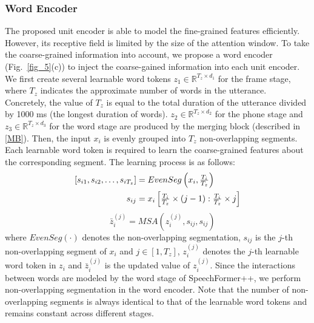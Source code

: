 \documentclass[lettersize,journal]{IEEEtran}
\begin{document}
\subsubsection{Word Encoder}
The proposed unit encoder is able to model the fine-grained features efficiently. However, its receptive field is limited by the size of the attention window. To take the coarse-grained information into account, we  propose a word encoder (Fig.~\ref{fig_5}(c)) to inject the coarse-gained information into each unit encoder. We first create several learnable word tokens $z_1 \in \mathbb{R}^{T_z \times d_1}$ for the frame stage, where $T_z$ indicates the approximate number of words in the utterance. Concretely, the value of $T_z$ is equal to the total duration of the utterance divided by 1000 ms (the longest duration of words). $z_2 \in \mathbb{R}^{T_z \times d_2}$ for the phone stage and $z_3 \in \mathbb{R}^{T_z \times d_3}$ for the word stage are produced by the merging block (described in \ref{MB}). Then, the input $x_i$ is evenly grouped into $T_z$ non-overlapping segments. Each learnable word token is required to learn the coarse-grained features about the corresponding segment. The learning process is  as follows:
\begin{equation}
\begin{aligned}
\relax [s_{i1}, s_{i2}, \dots, s_{iT_z}] &= EvenSeg\left(x_i, \tfrac{T_i}{T_z}\right) \\
\ s_{ij} &= x_i\left[\tfrac{T_i}{T_z} \times (j-1):\tfrac{T_i}{T_z} \times j\right]
\label{eq10}
\end{aligned}
\end{equation}
\begin{equation}
\ \ \ \ \; \bar{z}_i^{(j)} = MSA(z_i^{(j)}, s_{ij}, s_{ij})
\label{eq11}
\end{equation}
where $EvenSeg(\cdot)$ denotes the non-overlapping segmentation, $s_{ij}$ is the $j$-th non-overlapping segment of $x_i$ and $j \in [1, T_z]$, $z_i^{(j)}$ denotes the $j$-th learnable word token in $z_i$ and $\bar{z}_i^{(j)}$ is the updated value of $z_i^{(j)}$. Since the interactions between words are modeled by the word stage of SpeechFormer++, we perform non-overlapping segmentation in the word encoder. Note that the number of non-overlapping segments is always identical to that of the learnable word tokens and remains constant across different stages.
\end{document}
